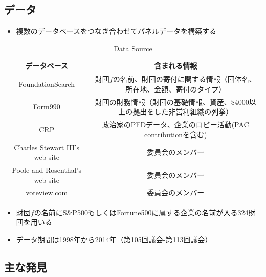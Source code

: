 \documentclass[../root]{subfiles}
\begin{document}
    \subsection{データ}\label{ux30c7ux30fcux30bf}

    \begin{itemize}
    
    \item
      複数のデータベースをつなぎ合わせてパネルデータを構築する
    \end{itemize}

    \begin{table}
          \centering
          \caption{Data Source}
          \begin{adjustbox}{max width=\textwidth}
          \begin{tabular}{cc}
            \hline
            データベース & 含まれる情報 \\
            \hline\hline
            FoundationSearch &
            財団\(f\)の名前、財団の寄付に関する情報（団体名、所在地、金額、寄付のタイプ）\\
            Form990 &
            財団の財務情報（財団の基礎情報、資産、\$4000以上の拠出をした非営利組織の列挙）\\
            CRP & 
            政治家のPFDデータ、企業のロビー活動(PAC contributionを含む) \\
            Charles Stewart III's web site & 委員会のメンバー \\
            Poole and Rosenthal's web site & 委員会のメンバー \\
            voteview.com & 委員会のメンバー \\
            \hline
          \end{tabular}
        \end{adjustbox}
        \end{table}

    \begin{itemize}
    
    \item
      財団\(f\)の名前にS\&P500もしくはFortune500に属する企業の名前が入る324財団を用いる
    \item
      データ期間は1998年から2014年（第105回議会-第113回議会）
    \end{itemize}

    \subsection{主な発見}\label{ux4e3bux306aux767aux898b}
\end{document}
